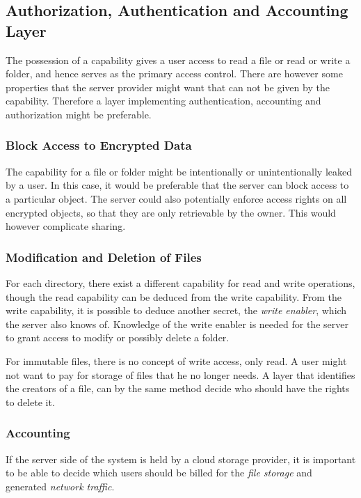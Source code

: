 \documentclass[pdftex,english,10pt,b5paper,twoside]{book}
\begin{document}
\subsection{Authorization, Authentication and Accounting Layer}

The possession of a capability gives a user access to read a file or read or
write a folder, and hence serves as the primary access control. There are
however some properties that the server provider might want that can not be
given by the capability. Therefore a layer implementing authentication,
accounting and authorization might be preferable.

\subsubsection{Block Access to Encrypted Data}

The capability for a file or folder might be intentionally or unintentionally
leaked by a user. In this case, it would be preferable that the server can
block access to a particular object. The server could also potentially enforce
access rights on all encrypted objects, so that they are only retrievable by
the owner. This would however complicate sharing. 

\subsubsection{Modification and Deletion of Files}

For each directory, there exist a different capability for read and write
operations, though the read capability can be deduced from the write
capability. From the write capability, it is possible to deduce another secret,
the \emph{write enabler}, which the server also knows of.  Knowledge of the
write enabler is needed for the server to grant access to modify or possibly
delete a folder.

For immutable files, there is no concept of write access, only read. A user
might not want to pay for storage of files that he no longer needs.  A layer
that identifies the creators of a file, can by the same method decide who
should have the rights to delete it.

\subsubsection{Accounting}

If the server side of the system is held by a cloud storage provider, it is
important to be able to decide which users should be billed for the \emph{file
storage} and generated \emph{network traffic}.
\end{document}
